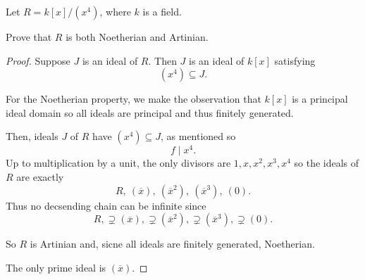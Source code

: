 \documentclass[11pt]{article}
\begin{document}
\begin{prob}
    Let $R = k[x]/(x^4)$, where $k$ is a field. 

    Prove that $R$ is both Noetherian and Artinian. 
\end{prob}
\begin{proof}
    Suppose $J$ is an ideal of $R$. 
    Then $J$ is an ideal of $k[x]$ 
    satisfying 
    \[
        (x^4) \subseteq J. 
    \]

    For the Noetherian property, we make 
    the observation that $k[x]$ is a 
    principal ideal domain so all ideals 
    are principal and thus finitely generated. 
    
    Then, ideals $J$ of $R$ have 
    $(x^4) \subseteq J$, as mentioned so 
    \[
        f \mid x^4. 
    \]
    Up to multiplication by a unit, the only divisors 
    are $1,x,x^2,x^3,x^4$ so the ideals of 
    $R$ are exactly 
    \[
        R, \ (\overline x), \ (\overline x^2), 
        \ (\overline x^3), \ (0). 
    \]
    Thus no decsending chain can be infinite since 
    \[
        R, \supsetneq (\overline x), \supsetneq (\overline x^2), 
        \supsetneq (\overline x^3), \supsetneq (0).
    \]

    So $R$ is Artinian and, sicne all ideals 
    are finitely generated, Noetherian. 

    The only prime ideal is $(\overline x)$. 
\end{proof}
\end{document}
